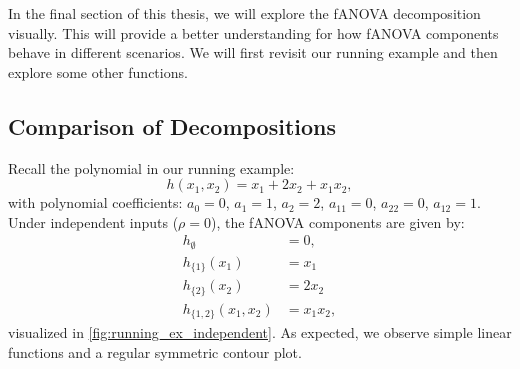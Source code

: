 In the final section of this thesis, we will explore the fANOVA decomposition visually. This will provide a better understanding for how fANOVA components behave in different scenarios. We will first revisit our running example and then explore some other functions.
\subsection{Comparison of Decompositions}
Recall the polynomial in our running example:
\[
h(x_1, x_2) = x_1 + 2 x_2 + x_1 x_2,
\]
with polynomial coefficients: $a_0 = 0$, $a_1 = 1$, $a_2 = 2$, $a_{11} = 0$, $a_{22} = 0$, $a_{12} = 1$.
Under independent inputs ($\rho = 0$), the fANOVA components are given by:
\begin{align*}
h_{\emptyset} &= 0, \\
h_{\{1\}}(x_1) &= x_1\\
h_{\{2\}}(x_2) &= 2x_2\\
h_{\{1,2\}}(x_1, x_2) &= x_1x_2,
\end{align*}
visualized in \autoref{fig:running_ex_independent}. As expected, we observe simple linear functions and a regular symmetric contour plot.
